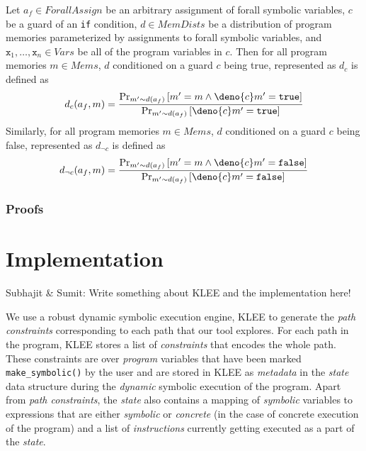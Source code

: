 \documentclass[acmsmall]{acmart}\settopmatter{}
\begin{document}
	\begin{definition}
		\label{def:cond}
		Let $a_f \in ForallAssign$ be an arbitrary assignment of forall symbolic variables, $c$ be a guard of an \texttt{if} condition, $d \in MemDists$ be a distribution of program memories parameterized by assignments to forall symbolic variables, and $\mathtt{x}_1,\ldots,\mathtt{x}_n \in Vars$ be all of the program variables in $c$. Then for all program memories $m \in Mems$, $d$ conditioned on a guard $c$ being true, represented as $d_c$ is defined as
		\[
		d_c(a_f,m) = \frac{\Pr_{m' \sim d(a_f)}\left[ m' = m \land \deno{c}m' = \mathtt{true} \right]}{\Pr_{m' \sim d(a_f)}\left[ \deno{c}m' = \mathtt{true} \right]}
		\]
		Similarly, for all program memories $m \in Mems$, $d$ conditioned on a guard $c$ being false, represented as $d_{\neg c}$ is defined as
		\[
		d_{\neg c}(a_f,m) = \frac{\Pr_{m' \sim d(a_f)}\left[ m' = m \land \deno{c}m' = \mathtt{false} \right]}{\Pr_{m' \sim d(a_f)}\left[ \deno{c}m' = \mathtt{false} \right]}
		\]
	\end{definition}
	
	\subsubsection{Proofs}
	\label{sec:proofs}
	
	\section{Implementation}
	\label{sec:implementation}
	
	{\color{red} Subhajit \& Sumit: Write something about KLEE and the implementation here!} 
	
	We use a robust dynamic symbolic execution engine, \textsc{KLEE} to generate the \textit{path constraints} corresponding to each path that our tool explores. For each path in the program, \textsc{KLEE} stores a list of \textit{constraints} that encodes the whole path. These constraints are over \textit{program} variables that have been marked \texttt{make\_symbolic()} by the user and are stored in \textsc{KLEE} as \textit{metadata} in the \textit{state} data structure during the \textit{dynamic} symbolic execution of the program. Apart from \textit{path constraints}, the \textit{state} also contains a mapping of \textit{symbolic} variables to expressions that are either  \textit{symbolic} or \textit{concrete} (in the case of concrete execution of the program) and a list of \textit{instructions} currently getting executed as a part of the \textit{state}.	
	
\end{document}
